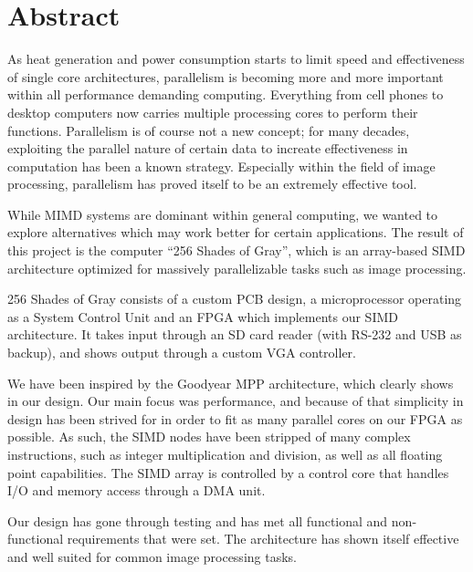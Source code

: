 \begingroup
\let\clearpage\relax
\let\cleardoublepage\relax
\let\cleardoublepage\relax

\chapter*{Abstract}
As heat generation and power consumption starts to limit speed and effectiveness
of single core architectures, parallelism is becoming more and more important
within all performance demanding computing. Everything from cell phones to
desktop computers now carries multiple processing cores to perform their
functions. Parallelism is of course not a new concept; for many decades,
exploiting the parallel nature of certain data to increate effectiveness in computation has
been a known strategy. Especially within the field of image processing,
parallelism has proved itself to be an extremely effective tool.

While \ac{MIMD} systems are dominant within general computing, we wanted to
explore alternatives which may work better for certain applications. The result
of this project is the computer ``256 Shades of Gray'', which is an array-based
\ac{SIMD} architecture optimized for massively parallelizable tasks such as
image processing.

256 Shades of Gray consists of a custom PCB design, a microprocessor operating
as a System Control Unit and an FPGA which implements our SIMD architecture. It
takes input through an SD card reader (with RS-232 and USB as backup), and shows
output through a custom VGA controller.

We have been inspired by the Goodyear MPP architecture, which clearly shows in
our design. Our main focus was performance, and because of that simplicity in
design has been strived for in order to fit as many parallel cores on our FPGA
as possible. As such, the SIMD nodes have been stripped of many
complex instructions, such as integer multiplication and division, as well as
all floating point capabilities. The SIMD array is controlled by a control core
that handles I/O and memory access through a DMA unit.

Our design has gone through testing and has met all functional and
non-functional requirements that were set. The architecture has shown itself
effective and well suited for common image processing tasks.
\endgroup
